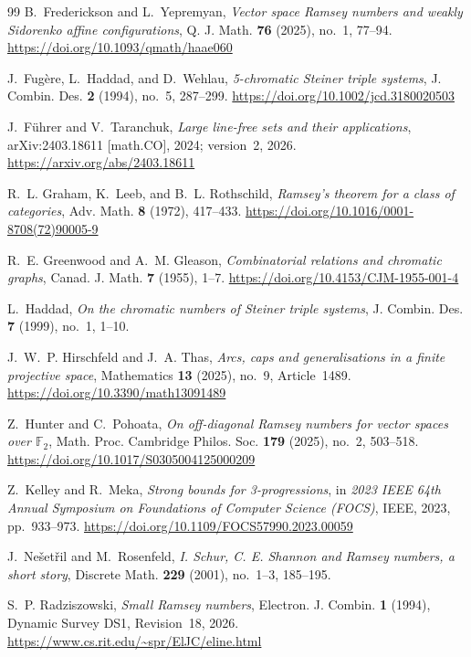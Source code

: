 \documentclass[11pt]{article}
\theoremstyle{plain}
\begin{document}
\begin{thebibliography}{99}
B.~Frederickson and L.~Yepremyan,
\emph{Vector space Ramsey numbers and weakly Sidorenko affine configurations},
Q. J. Math. \textbf{76} (2025), no.~1, 77--94.
\url{https://doi.org/10.1093/qmath/haae060}

J.~Fug\`ere, L.~Haddad, and D.~Wehlau,
\emph{5-chromatic Steiner triple systems},
J. Combin. Des. \textbf{2} (1994), no.~5, 287--299.
\url{https://doi.org/10.1002/jcd.3180020503}

J.~F\"uhrer and V.~Taranchuk,
\emph{Large line-free sets and their applications},
arXiv:2403.18611 [math.CO], 2024; version~2, 2026.
\url{https://arxiv.org/abs/2403.18611}

R.~L. Graham, K.~Leeb, and B.~L. Rothschild,
\emph{Ramsey's theorem for a class of categories},
Adv. Math. \textbf{8} (1972), 417--433.
\url{https://doi.org/10.1016/0001-8708(72)90005-9}

R.~E. Greenwood and A.~M. Gleason,
\emph{Combinatorial relations and chromatic graphs},
Canad. J. Math. \textbf{7} (1955), 1--7.
\url{https://doi.org/10.4153/CJM-1955-001-4}

L.~Haddad,
\emph{On the chromatic numbers of Steiner triple systems},
J. Combin. Des. \textbf{7} (1999), no.~1, 1--10.

J.~W.~P. Hirschfeld and J.~A. Thas,
\emph{Arcs, caps and generalisations in a finite projective space},
Mathematics \textbf{13} (2025), no.~9, Article~1489.
\url{https://doi.org/10.3390/math13091489}

Z.~Hunter and C.~Pohoata,
\emph{On off-diagonal Ramsey numbers for vector spaces over $\mathbb{F}_{2}$},
Math. Proc. Cambridge Philos. Soc. \textbf{179} (2025), no.~2, 503--518.
\url{https://doi.org/10.1017/S0305004125000209}

Z.~Kelley and R.~Meka,
\emph{Strong bounds for 3-progressions},
in \emph{2023 IEEE 64th Annual Symposium on Foundations of Computer Science (FOCS)},
IEEE, 2023, pp.~933--973.
\url{https://doi.org/10.1109/FOCS57990.2023.00059}

J.~Ne\v{s}et\v{r}il and M.~Rosenfeld,
\emph{I. Schur, C. E. Shannon and Ramsey numbers, a short story},
Discrete Math. \textbf{229} (2001), no.~1--3, 185--195.

S.~P. Radziszowski,
\emph{Small Ramsey numbers},
Electron. J. Combin. \textbf{1} (1994), Dynamic Survey DS1, Revision~18, 2026.
\url{https://www.cs.rit.edu/~spr/ElJC/eline.html}


\end{thebibliography}
\end{document}
